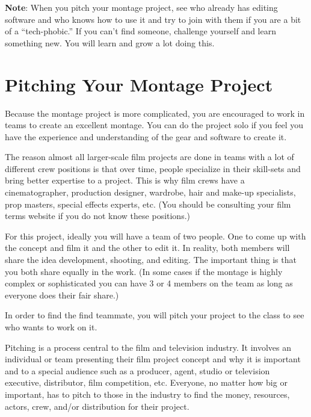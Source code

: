 \documentclass[
]{book}
\begin{document}
\begin{caution}
\textbf{Note}: When you pitch your montage project, see who already has editing software and who knows how to use it and try to join with them if you are a bit of a ``tech-phobic.'' If you can't find someone, challenge yourself and learn something new. You will learn and grow a lot doing this.
\end{caution}

\hypertarget{pitching-your-montage-project}{%
\section{Pitching Your Montage Project}\label{pitching-your-montage-project}}

Because the montage project is more complicated, you are encouraged to work in teams to create an excellent montage. You can do the project solo if you feel you have the experience and understanding of the gear and software to create it.

The reason almost all larger-scale film projects are done in teams with a lot of different crew positions is that over time, people specialize in their skill-sets and bring better expertise to a project. This is why film crews have a cinematographer, production designer, wardrobe, hair and make-up specialists, prop masters, special effects experts, etc. (You should be consulting your film terms website if you do not know these positions.)

For this project, ideally you will have a team of two people. One to come up with the concept and film it and the other to edit it. In reality, both members will share the idea development, shooting, and editing. The important thing is that you both share equally in the work. (In some cases if the montage is highly complex or sophisticated you can have 3 or 4 members on the team as long as everyone does their fair share.)

In order to find the find teammate, you will pitch your project to the class to see who wants to work on it.

Pitching is a process central to the film and television industry. It involves an individual or team presenting their film project concept and why it is important and to a special audience such as a producer, agent, studio or television executive, distributor, film competition, etc. Everyone, no matter how big or important, has to pitch to those in the industry to find the money, resources, actors, crew, and/or distribution for their project.
\end{document}
